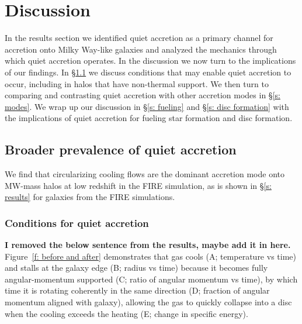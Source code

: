 \documentclass[fleqn,usenatbib]{mnras}
\begin{document}
\section{Discussion}
\label{s: discussion}

In the results section we identified quiet accretion as a primary channel for accretion onto Milky Way-like galaxies and analyzed the mechanics through which quiet accretion operates.
In the discussion we now turn to the implications of our findings.
In \S\ref{s: broader prevalence} we discuss conditions that may enable quiet accretion to occur, including in halos that have non-thermal support.
We then turn to comparing and contrasting quiet accretion with other accretion modes in \S\ref{s: modes}.
We wrap up our discussion in \S\ref{s: fueling} and \S\ref{s: disc formation} with the implications of quiet accretion for fueling star formation and disc formation.

\subsection{Broader prevalence of quiet accretion}
\label{s: broader prevalence}

We find that circularizing cooling flows are the dominant accretion mode onto MW-mass halos at low redshift in the FIRE simulation, as is shown in \S\ref{s: results} for galaxies from the FIRE simulations.

\subsubsection{Conditions for quiet accretion}
\label{s: broader prevalence -- conditions}

\textbf{I removed the below sentence from the results, maybe add it in here.}
Figure~\ref{f: before and after} demonstrates that gas cools (A; temperature vs time) and stalls at the galaxy edge (B; radius vs time) because it becomes fully angular-momentum supported (C; ratio of angular momentum vs time), by which time it is rotating coherently in the same direction (D; fraction of angular momentum aligned with galaxy), allowing the gas to quickly collapse into a disc when the cooling exceeds the heating (E; change in specific energy).
\end{document}
